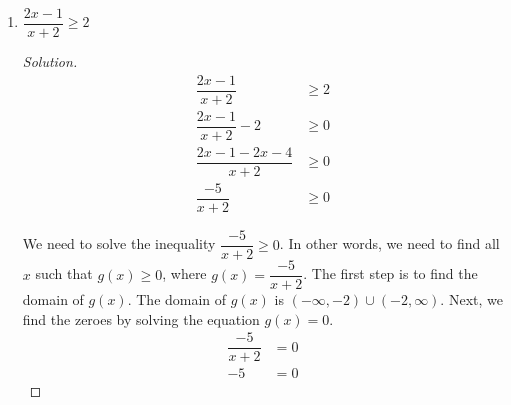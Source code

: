 \documentclass[12pt]{article}
\newenvironment{solution}{\begin{proof}[Solution]}{\end{proof}}
\begin{document}
\begin{enumerate}
\begin{enumerate}
			\begin{solution}
				We need to solve the inequality $\dfrac{2x-1}{x+2}\geq 0$. In other words, we need to find all $x$ such that $g(x) \geq 0$, where $g(x)=\dfrac{2x-1}{x+2}$. The first step is to find the domain of $g(x)$, which is all real numbers such that $x+2\neq0$. Thus, the domain of $g(x)$ is $(-\infty, -2) \cup (-2, \infty) $. Next, we find the zeroes by solving the equation $g(x)=0$.
				
				\begin{align*}
					\dfrac{2x-1}{x+2}&=0\\
					2x-1&=0\\
					x&=\dfrac{1}{2}.
				\end{align*}
				
				$\dfrac{1}{2}$ is in the domain of $g(x)$, so it is a zero. Using this information, we can draw a sign chart. 
				
				\[
				\begin{tikzpicture}[scale=1]
					\draw[->] (-5,0) -- (5,0);
					
					\draw (1.5,0) node[circle,blue,fill,inner sep=2pt]{};
					\draw[blue, thick, fill=white] (-2.5,0) circle (2.5pt);
					
					\node at (-2.5, .5) {-2};
					\node at (1.5, .5) {1/2};
					\node at (-5,.5) {$g\colon$};
					\node at (-3.5,.5) {$+$};
					\node at (-0.4,.5) {$-$};
					\node at (3, .5) {$+$};
				\end{tikzpicture}
				\]		
				
				Since we are trying to find all $x$ such that $\dfrac{2x-1}{x+2}$ is positive or equal to $0$, using the sign chart, we conclude that the solution is $(\infty, -2) \cup [1/2, \infty]$.
			\end{solution}
			\item $\dfrac{2x-1}{x+2} \geq 2$
			
			\begin{solution}
				\begin{align*}
					\dfrac{2x-1}{x+2}&\geq 2\\
					\dfrac{2x-1}{x+2} - 2&\geq 0\\
					\dfrac{2x-1-2x-4}{x+2} &\geq 0\\
					\dfrac{-5}{x+2}&\geq 0
				\end{align*}
				
				We need to solve the inequality $\dfrac{-5}{x+2}\geq 0$. In other words, we need to find all $x$ such that $g(x) \geq 0$, where $g(x)=\dfrac{-5}{x+2}$. The first step is to find the domain of $g(x)$. The domain of $g(x)$ is $(-\infty, -2) \cup (-2, \infty) $. Next, we find the zeroes by solving the equation $g(x)=0$.
				\begin{align*}
					\dfrac{-5}{x+2}&=0\\
					-5&=0
				\end{align*}
				

\end{solution}
\end{enumerate}
\end{enumerate}
\end{document}
